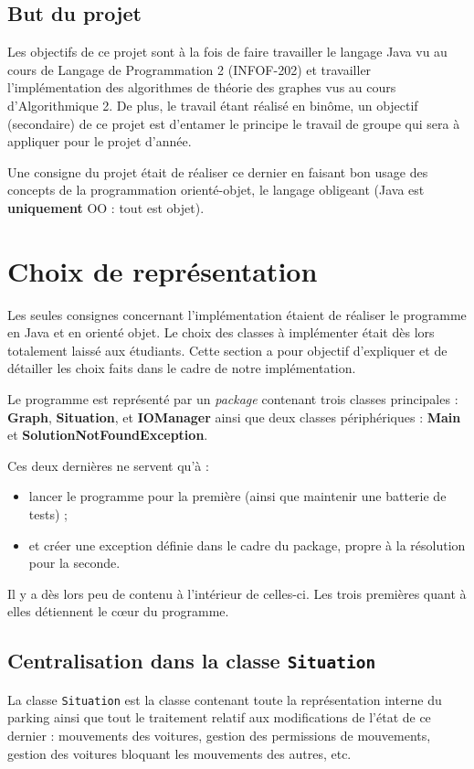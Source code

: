 \documentclass{article}
\begin{document}
	\subsection{But du projet}
		Les objectifs de ce projet sont à la fois de faire travailler le langage Java vu au cours de Langage de Programmation 2 (INFOF-202) et
		travailler l'implémentation des algorithmes de théorie des graphes vus au cours d'Algorithmique 2. De plus, le travail étant réalisé en binôme,
		un objectif (secondaire) de ce projet est d'entamer le principe le travail de groupe qui sera à appliquer pour le projet d'année.

		Une consigne du projet était de réaliser ce dernier en faisant bon usage des concepts de la programmation orienté-objet, le langage
		obligeant (Java est \textbf{uniquement} OO : tout est objet).

\section{Choix de représentation}
	Les seules consignes concernant l'implémentation étaient de réaliser le programme en Java et en orienté objet. Le choix des classes à implémenter était
	dès lors totalement laissé aux étudiants. Cette section a pour objectif d'expliquer et de détailler les choix faits dans le cadre de notre implémentation.

	Le programme est représenté par un \textit{package} contenant trois classes principales : \textbf{Graph}, \textbf{Situation}, et \textbf{IOManager}
	ainsi que deux classes périphériques : \textbf{Main} et \textbf{SolutionNotFoundException}.

	Ces deux dernières ne servent qu'à :
	
	\begin{itemize}
		\item lancer le programme pour la première (ainsi que maintenir une batterie de tests) ;
		\item et créer une exception définie dans le cadre du package, propre à la résolution pour la seconde.
	\end{itemize}
	
	Il y a dès lors peu de contenu à l'intérieur de celles-ci. Les trois premières quant à elles détiennent le cœur du programme.

	\subsection{Centralisation dans la classe \texttt{Situation}}
		La classe \texttt{Situation} est la classe contenant toute la représentation interne du parking ainsi que tout le traitement relatif aux
		modifications de l'état de ce dernier : mouvements des voitures, gestion des permissions de mouvements, gestion des voitures bloquant
		les mouvements des autres, etc.
\end{document}
